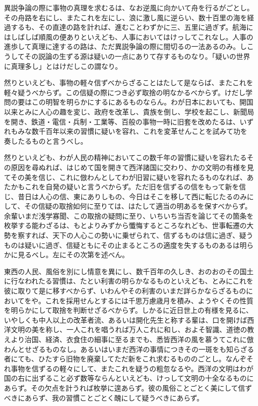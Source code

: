 \documentclass[a4paper, platex, dvipdfmx]{jsarticle}
\begin{document}
異説争論の際に事物の真理を求むるは、なお逆風に向かいて舟を行るがごとし。その舟路を右にし、またこれを左にし、浪に激し風に逆らい、数十百里の海を経過するも、その直達の路を計れば、進むことわずかに三、五里に過ぎず。航海にはしばしば順風の便ありといえども、人事においてはけっしてこれなし。人事の進歩して真理に達するの路は、ただ異説争論の際に間切るの一法あるのみ。しこうしてその説論の生ずる源は疑いの一点にありて存するものなり。「疑いの世界に真理多し」とはけだしこの謂なり。

然りといえども、事物の軽々信ずべからざることはたして是ならば、またこれを軽々疑うべからず。この信疑の際につき必ず取捨の明なかるべからず。けだし学問の要はこの明智を明らかにするにあるものならん。わが日本においても、開国以来とみに人心の趣を変じ、政府を改革し、貴族を倒し、学校を起こし、新聞局を開き、鉄道・電信・兵制・工業等、百般の事物一時に旧套を改めたるは、いずれもみな数千百年以来の習慣に疑いを容れ、これを変革せんことを試みて功を奏したるものと言うべし。

然りといえども、わが人民の精神においてこの数千年の習慣に疑いを容れたるその原因を尋ぬれば、はじめて国を開きて西洋諸国に交わり、かの文明の有様を見てその美を信じ、これに倣わんとしてわが旧習に疑いを容れたるものなれば、あたかもこれを自発の疑いと言うべからず。ただ旧を信ずるの信をもって新を信じ、昔日は人心の信、東にありしもの、今日はそこを移して西に転じたるのみにして、その信疑の取捨如何に至りては、はたして適当の明あるを保すべからず。余輩いまだ浅学寡聞、この取捨の疑問に至り、いちいち当否を論じてその箇条を枚挙する能わざるは、もとよりみずから懺悔するところなれども、世事転遷の大勢を察すれば、天下の人心この勢いに乗ぜられて、信ずるものは信に過ぎ、疑うものは疑いに過ぎ、信疑ともにその止まるところの適度を失するものあるは明らかに見るべし。左にその次第を述べん。

東西の人民、風俗を別にし情意を異にし、数千百年の久しき、おのおのその国土に行なわれたる習慣は、たとい利害の明らかなるものといえども、とみにこれを彼に取りて是に移すべからず、いわんやその利害のいまだ詳らかならざるものにおいてをや。これを採用せんとするには千思万慮歳月を積み、ようやくその性質を明らかにして取捨を判断せざるべからず。しかるに近日世上の有様を見るに、いやしくも中人以上の改革者流、あるいは開化先生と称する輩は、口を開けば西洋文明の美を称し、一人これを唱うれば万人これに和し、およそ智識、道徳の教えより治国、経済、衣食住の細事に至るまでも、悉皆西洋の風を慕うてこれに倣わんとせざるものなし。あるいはいまだ西洋の事情につきその一斑をも知らざる者にても、ひたすら旧物を廃棄してただ新をこれ求むるもののごとし。なんぞそれ事物を信ずるの軽々にして、またこれを疑うの粗忽なるや。西洋の文明はわが国の右に出ずること必ず数等ならんといえども、けっして文明の十全なるものにあらず。その欠点を計うれば枚挙に遑あらず。彼の風俗ことごとく美にして信ずべきにあらず、我の習慣ことごとく醜にして疑うべきにあらず。
\end{document}
